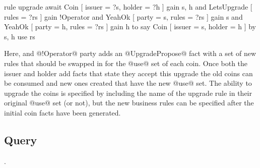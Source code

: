 \begin{small}
\begin{code}
  rule  upgrade
  await Coin [ issuer = ?s, holder = ?h ]  gain {s, h}
    and LetsUpgrade [ rules = ?rs ]     gain {!Operator}
    and YeahOk      [ party = s, rules = ?rs ] gain {s}
    and YeahOk      [ party = h, rules = ?rs ] gain {h}
   to
    say Coin [ issuer = s, holder = h ]
     by {s, h} use rs
\end{code}
\end{small}

Here, and @!Operator@ party adds an @UpgradePropose@ fact with a set of new rules that should be swapped in for the @use@ set of each coin. Once both the issuer and holder add facts that state they accept this upgrade the old coins can be consumed and new ones created that have the new @use@ set. The ability to upgrade the coins is specified by including the name of the upgrade rule in their original @use@ set (or not), but the new business rules can be specified after the initial coin facts have been generated.


\subsection{Query}
.







